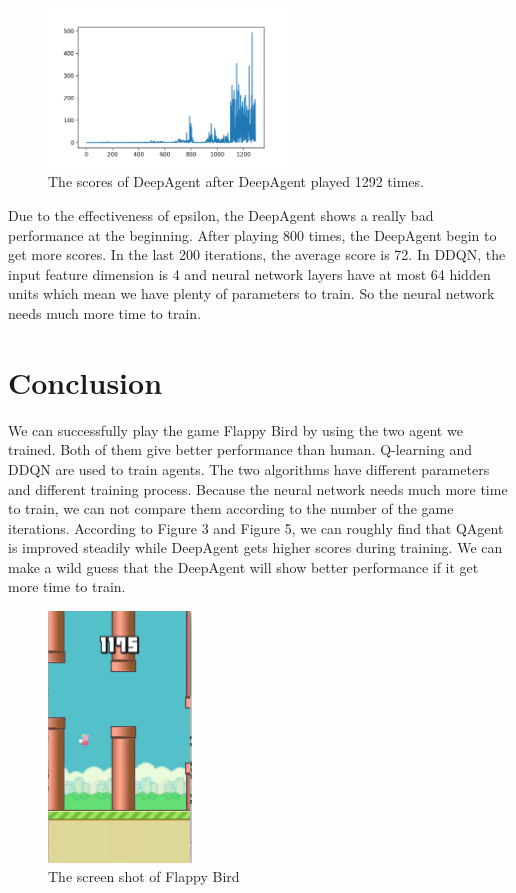 \documentclass[conference,compsoc]{IEEEtran}
\begin{document}
\begin{figure}[!t]
\centering
\includegraphics[width=2.5in]{DDQN_result.png}
\caption{The scores of DeepAgent after DeepAgent played 1292 times.}
\label{fig5}
\end{figure}


Due to the effectiveness of epsilon, the DeepAgent shows a really bad performance at the beginning. After playing 800 times, the DeepAgent begin to get more scores. In the last 200 iterations,  the average score is 72. In DDQN, the input feature dimension is 4 and neural network layers have at most 64 hidden units which mean we have plenty of parameters to train. So the neural network needs much more time to train.



\section{Conclusion}

We can successfully play the game Flappy Bird by using the two agent we trained. Both of them give better performance than human. Q-learning and DDQN are used to train agents. The two algorithms have different parameters and different training process.  Because the neural network needs much more time to train, we can not compare them according to the number of the game iterations. According to Figure 3 and Figure 5, we can roughly find that QAgent is improved steadily while DeepAgent gets higher scores during training. We can make a wild guess that the DeepAgent will show better performance if it get more time to train.
\begin{figure}[!t]
\centering
\includegraphics[width=1.5in]{f3}
\caption{The screen shot of Flappy Bird}
\label{fig_7}
\end{figure}
\end{document}

